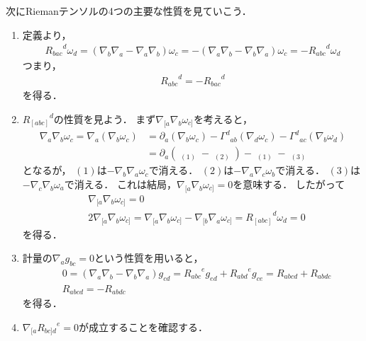 \documentclass[a4paper]{jsarticle}
\begin{document}
次にRiemanテンソルの4つの主要な性質を見ていこう．
\begin{enumerate}
	\item 定義より，
		\begin{align}
			{R_{bac}}^d \omega_d
			= \left( \nabla_b \nabla_a - \nabla_a \nabla_b \right) \omega_c
			= - \left( \nabla_a \nabla_b - \nabla_b \nabla_a \right) \omega_c
			= - {R_{abc}}^d \omega_d
		\end{align}
		つまり，
		\begin{align}
			{R_{abc}}^d = -{R_{bac}}^d
		\end{align}
		を得る．
	\item ${R_{[abc]}}^d$の性質を見よう．
		まず$\nabla_{[a} \nabla_b \omega_{c]}$を考えると，
		\begin{align}
			\nabla_a \nabla_b \omega_c = \nabla_a \left( \nabla_b \omega_c \right)
			&= \partial_a \left( \nabla_b \omega_c \right)
			- {\Gamma^d}_{ab} \left( \nabla_d \omega_c \right)
			- {\Gamma^d}_{ac} \left( \nabla_b \omega_d \right) \\
			&= \partial_a \left( \mathop{\underline{\partial_b \omega_c}}_{(1)}
			- \mathop{\underline{{\Gamma^e}_{bc} \omega_e}}_{(2)} \right)
			- \mathop{\underline{{\Gamma^d}_{ab}
			\left( \partial_d \omega_c - {\Gamma^e}_{dc} \omega_e \right)}}_{(1)}
			- \mathop{\underline{{\Gamma^d}_{ac}
			\left( \partial_b \omega_d - {\Gamma^e}_{bd} \omega_e \right)}}_{(3)}
		\end{align}
		となるが，
		$(1)$は$-\nabla_b \nabla_a \omega_c$で消える．
		$(2)$は$-\nabla_a \nabla_c \omega_b$で消える．
		$(3)$は$-\nabla_c \nabla_b \omega_a$で消える．
		これは結局，$\nabla_{[a} \nabla_b \omega_{c]}=0$を意味する．
		したがって
		\begin{align}
			&\nabla_{[a} \nabla_b \omega_{c ]} = 0 \\
			&2 \nabla_{[a} \nabla_b \omega_{c ]}
			= \nabla_{[a} \nabla_b \omega_{c ]} - \nabla_{[b} \nabla_a \omega_{c ]}
			= {R_{[abc]}}^d \omega_d
			= 0
		\end{align}
		を得る．
	\item 計量の$\nabla_a g_{bc}=0$という性質を用いると，
		\begin{align}
			&0 = \left( \nabla_a \nabla_b - \nabla_b \nabla_a \right) g_{cd}
			= {R_{abc}}^e g_{ed} + {R_{abd}}^e g_{ce}
			= R_{abcd} + R_{abdc} \\
			&R_{abcd} = -R_{abdc}
		\end{align}
		を得る．
	\item $\nabla_{[a} {R_{bc]d}}^e = 0$が成立することを確認する．

\end{enumerate}
\end{document}
